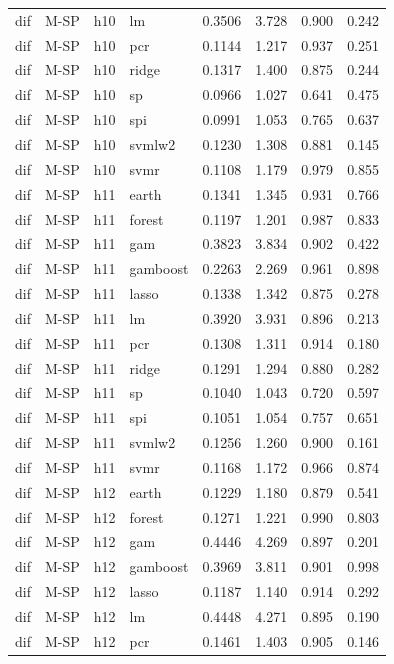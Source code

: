 \begin{ThreePartTable}
\begin{longtable}[t]{llclcccc}
dif & M-SP & h10 & lm & 0.3506 & 3.728 & 0.900 & 0.242\\
dif & M-SP & h10 & pcr & 0.1144 & 1.217 & 0.937 & 0.251\\
dif & M-SP & h10 & ridge & 0.1317 & 1.400 & 0.875 & 0.244\\
dif & M-SP & h10 & sp & 0.0966 & 1.027 & 0.641 & 0.475\\
dif & M-SP & h10 & spi & 0.0991 & 1.053 & 0.765 & 0.637\\
dif & M-SP & h10 & svmlw2 & 0.1230 & 1.308 & 0.881 & 0.145\\
dif & M-SP & h10 & svmr & 0.1108 & 1.179 & 0.979 & 0.855\\
\addlinespace
dif & M-SP & h11 & earth & 0.1341 & 1.345 & 0.931 & 0.766\\
dif & M-SP & h11 & forest & 0.1197 & 1.201 & 0.987 & 0.833\\
dif & M-SP & h11 & gam & 0.3823 & 3.834 & 0.902 & 0.422\\
dif & M-SP & h11 & gamboost & 0.2263 & 2.269 & 0.961 & 0.898\\
dif & M-SP & h11 & lasso & 0.1338 & 1.342 & 0.875 & 0.278\\
dif & M-SP & h11 & lm & 0.3920 & 3.931 & 0.896 & 0.213\\
dif & M-SP & h11 & pcr & 0.1308 & 1.311 & 0.914 & 0.180\\
dif & M-SP & h11 & ridge & 0.1291 & 1.294 & 0.880 & 0.282\\
dif & M-SP & h11 & sp & 0.1040 & 1.043 & 0.720 & 0.597\\
dif & M-SP & h11 & spi & 0.1051 & 1.054 & 0.757 & 0.651\\
dif & M-SP & h11 & svmlw2 & 0.1256 & 1.260 & 0.900 & 0.161\\
dif & M-SP & h11 & svmr & 0.1168 & 1.172 & 0.966 & 0.874\\
\addlinespace
dif & M-SP & h12 & earth & 0.1229 & 1.180 & 0.879 & 0.541\\
dif & M-SP & h12 & forest & 0.1271 & 1.221 & 0.990 & 0.803\\
dif & M-SP & h12 & gam & 0.4446 & 4.269 & 0.897 & 0.201\\
dif & M-SP & h12 & gamboost & 0.3969 & 3.811 & 0.901 & 0.998\\
dif & M-SP & h12 & lasso & 0.1187 & 1.140 & 0.914 & 0.292\\
dif & M-SP & h12 & lm & 0.4448 & 4.271 & 0.895 & 0.190\\
dif & M-SP & h12 & pcr & 0.1461 & 1.403 & 0.905 & 0.146\\

\end{longtable}
\end{ThreePartTable}
